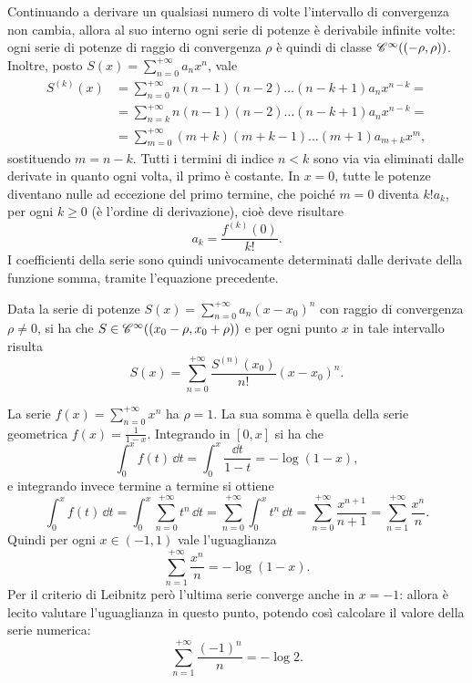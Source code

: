 Continuando a derivare un qualsiasi numero di volte l'intervallo di convergenza non cambia, allora al suo interno ogni serie di potenze è derivabile infinite volte: ogni serie di potenze di raggio di convergenza $\rho$ è quindi di classe $\cont[\infty]{(-\rho,\rho)}$. Inoltre, posto $S(x)=\sum_{n=0}^{+\infty}a_nx^n$, vale
\[\begin{split}
S^{(k)}(x)	&=\sum_{n=0}^{+\infty}n(n-1)(n-2)\dots(n-k+1)a_nx^{n-k}=\\
			&=\sum_{n=k}^{+\infty}n(n-1)(n-2)\dots(n-k+1)a_nx^{n-k}=\\
			&=\sum_{m=0}^{+\infty}(m+k)(m+k-1)\dots(m+1)a_{m+k}x^m,
\end{split}\]
sostituendo $m=n-k$. Tutti i termini di indice $n<k$ sono via via eliminati dalle derivate in quanto ogni volta, il primo è costante.
In $x=0$, tutte le potenze diventano nulle ad eccezione del primo termine, che poiché $m=0$ diventa $k!a_k$, per ogni $k\geq 0$ (è l'ordine di derivazione), cioè deve risultare
\[
a_k=\frac{f^{(k)}(0)}{k!}.
\]
I coefficienti della serie sono quindi univocamente determinati dalle derivate della funzione somma, tramite l'equazione precedente.
\begin{teorema}
	Data la serie di potenze $S(x)=\sum_{n=0}^{+\infty}a_n(x-x_0)^n$ con raggio di convergenza $\rho\ne 0$, si ha che $S\in\cont[\infty]{(x_0-\rho,x_0+\rho)}$ e per ogni punto $x$ in tale intervallo risulta
	\begin{equation} \label{eq:serie_potenze_taylor}
		S(x)=\sum_{n=0}^{+\infty}\frac{S^{(n)}(x_0)}{n!}(x-x_0)^n.
	\end{equation}
\end{teorema}
\begin{esempio} \label{es:serie-potenze-integrale-log2}
	La serie $f(x)=\sum_{n=0}^{+\infty}x^n$ ha $\rho=1$. La sua somma è quella della serie geometrica $f(x)=\frac1{1-x}$. Integrando in $[0,x]$ si ha che
	\[
	\int_0^xf(t)\,\dd t=\int_0^x\frac{\dd t}{1-t}=-\log(1-x),
	\]
	e integrando invece termine a termine si ottiene
	\[
	\int_0^xf(t)\,\dd t=\int_0^x\sum_{n=0}^{+\infty}t^n\,\dd t=\sum_{n=0}^{+\infty}\int_0^xt^n\,\dd t=\sum_{n=0}^{+\infty}\frac{x^{n+1}}{n+1}=\sum_{n=1}^{+\infty}\frac{x^n}{n}.
	\]
	Quindi per ogni $x\in(-1,1)$ vale l'uguaglianza
	\[
	\sum_{n=1}^{+\infty}\frac{x^n}{n}=-\log(1-x).
	\]
	Per il criterio di Leibnitz però l'ultima serie converge anche in $x=-1$: allora è lecito valutare l'uguaglianza in questo punto, potendo così calcolare il valore della serie numerica:
	\[
	\sum_{n=1}^{+\infty}\frac{(-1)^n}{n}=-\log 2.
	\]
\end{esempio}
